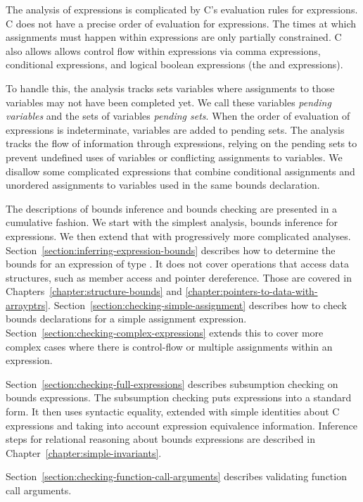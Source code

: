 The analysis of expressions is complicated by C's evaluation
rules for expressions.  C does not have a precise order of evaluation
for expressions.  The times at which assignments
must happen within expressions are only partially constrained.
C also allows allows control flow within 
expressions via comma expressions, conditional expressions, and
logical boolean expressions (the \code{&&} and \code{||} expressions).

To handle this, the analysis tracks sets variables where assignments
to those variables may not have been completed yet.  We call these
variables {\em pending variables} and the sets of variables {\em
pending sets}.  When the order of evaluation of expressions
is indeterminate, variables are added to pending sets.
The analysis tracks the flow of information through expressions, relying on the
pending sets to prevent undefined uses of variables or conflicting
assignments to variables.  We disallow some complicated expressions
that combine conditional assignments and unordered assignments
to variables used in the same bounds declaration.

The descriptions of bounds inference and bounds checking are
presented in a cumulative fashion.  We start with the simplest
analysis, bounds inference for expressions.  We then extend that
with progressively more complicated analyses.
Section~\ref{section:inferring-expression-bounds}
describes how to determine the bounds for an expression of type \arrayptr.
It does not cover operations that access data structures, such as member
access and pointer dereference. 
Those are covered in Chapters~\ref{chapter:structure-bounds} and 
\ref{chapter:pointers-to-data-with-arrayptrs}.
Section~\ref{section:checking-simple-assignment} describes
how to check bounds declarations for a simple assignment
expression.
Section~\ref{section:checking-complex-expressions}
extends this to cover more complex cases where there is control-flow
or multiple assignments within an expression.

Section~\ref{section:checking-full-expressions} describes
subsumption checking on bounds expressions.   The subsumption checking
puts expressions into a standard form.  It then uses syntactic equality,
extended with simple identities about C expressions and taking into account expression
equivalence information.
Inference steps for relational reasoning about bounds expressions 
are described in Chapter~\ref{chapter:simple-invariants}.

Section~\ref{section:checking-function-call-arguments}
describes validating function call arguments.

